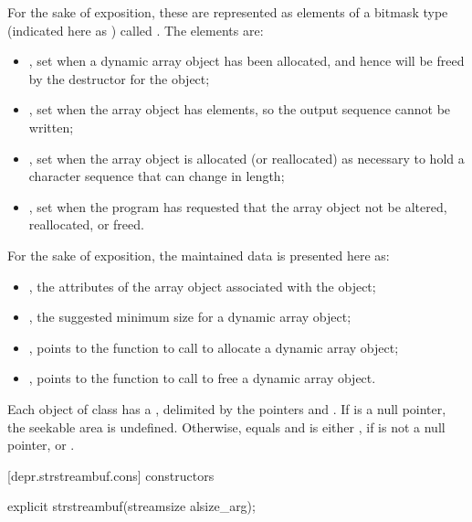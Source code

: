 \pnum
\begin{note}
For the sake of exposition, these are represented as elements of a bitmask type
(indicated here as ) called .
The elements are:
\begin{itemize}
\item
{}, set when a dynamic array object has been
allocated, and hence will be freed by the destructor for the
 object;
\item
{}, set when the array object has
 elements, so the output sequence cannot be written;
\item
{}, set when the array object is allocated
(or reallocated)
as necessary to hold a character sequence that can change in length;
\item
{}, set when the program has requested that the
array object not be altered, reallocated, or freed.
\end{itemize}
\end{note}

\pnum
\begin{note}
For the sake of exposition, the maintained data is presented here as:
\begin{itemize}
\item
{}, the attributes of the array object
associated with the  object;
\item
{}, the suggested minimum size for a
dynamic array object;
\item
{}, points to the function
to call to allocate a dynamic array object;
\item
{}, points to the function to
call to free a dynamic array object.
\end{itemize}
\end{note}

\pnum
Each object of class
has a
,
delimited by the pointers  and .
If  is a null pointer, the seekable area is undefined.
Otherwise,  equals  and
 is either ,
if  is not a null pointer, or .

[depr.strstreambuf.cons]{ constructors}

%
\begin{itemdecl}
explicit strstreambuf(streamsize alsize_arg);
\end{itemdecl}

